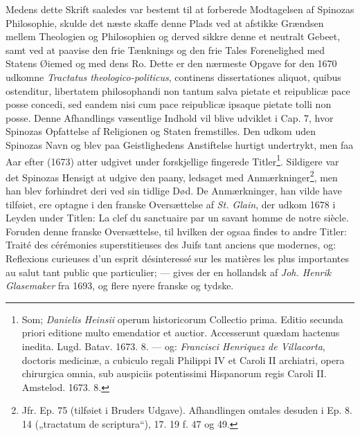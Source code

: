 \documentclass[12pt,a4paper]{book}
\newcommand{\opage}[1]{\marginnote{\footnotesize\textit{[#1]}}}
\begin{document}
Medens dette Skrift saaledes var bestemt til at forberede Modtagelsen af
Spinozas Philosophie, skulde det næste skaffe denne Plads ved at afstikke
Grændsen mellem Theologien og Philosophien og derved sikkre denne et
neutralt Gebeet, samt ved at paavise den frie Tænknings og den frie Tales
Forenelighed med Statens Øiemed og med dens Ro. Dette er den nærmeste
Opgave for den 1670 udkomne \emph{Tractatus theologico-politicus},
continens dissertationes aliquot, quibus ostenditur, libertatem
philosophandi non tantum salva pietate et reipublicæ pace posse concedi,
sed eandem nisi cum pace reipublicæ ipsaque pietate tolli non posse. Denne
Afhandlings væsentlige Indhold vil blive udviklet i Cap. 7, hvor Spinozas
Opfattelse af Religionen og Staten fremstilles. Den udkom uden Spinozas
Navn og blev paa Geistlighedens Anstiftelse hurtigt undertrykt, men faa
Aar efter (1673) atter udgivet under forskjellige fingerede
Titler\footnote{Som; \emph{Danielis Heinsii} operum historicorum Collectio
prima. Editio secunda priori editione multo emendatior et auctior.
Accesserunt quædam hactenus inedita. Lugd. Batav. 1673. 8. --- og:
\emph{Francisci Henriquez de Villacorta}, doctoris medicinæ, a cubiculo
regali Philippi IV et Caroli II archiatri, opera chirurgica omnia, sub
auspiciis potentissimi Hispanorum regis Caroli II. Amstelod. 1673. 8.}.
Sildigere var det Spinozas Hensigt
\opage{36} \setcounter{footnote}{0}%
at udgive den paany, ledsaget med Anmærkninger\footnote{Jfr. Ep. 75
(tilføiet i Bruders Udgave). Afhandlingen omtales desuden i Ep. 8. 14
(„tractatum de scriptura“), 17. 19 f. 47 og 49.}, men han blev forhindret
deri ved sin tidlige Død. De Anmærkninger, han vilde have tilføiet, ere
optagne i den franske Oversættelse af \emph{St. Glain}, der udkom 1678 i
Leyden under Titlen: La clef du sanctuaire par un savant homme de notre
siècle. Foruden denne franske Oversættelse, til hvilken der ogsaa findes
to andre Titler: Traité des cérémonies superstitieuses des Juifs tant
anciens que modernes, og: Reflexions curieuses d'un esprit désinteressé
sur les matières les plus importantes au salut tant public que
particulier; --- gives der en hollandsk af \emph{Joh. Henrik Glasemaker}
fra 1693, og flere nyere franske og tydske.
\end{document}
